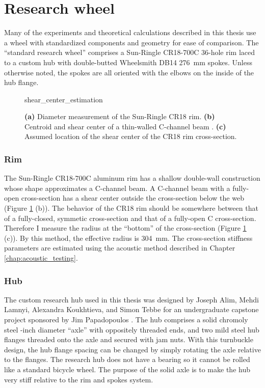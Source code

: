\documentclass[../../thesis.tex]{subfiles}
\begin{document}
\section{Research wheel}
\label{app:std_research_wheel}
Many of the experiments and theoretical calculations described in this thesis use a wheel with standardized components and geometry for ease of comparison. The ``standard research wheel'' comprises a Sun-Ringle CR18-700C 36-hole rim laced to a custom hub with double-butted Wheelsmith DB14 \SI{276}{mm} spokes. Unless otherwise noted, the spokes are all oriented with the elbows on the inside of the hub flange.

\begin{figure}[h]
\centering
{shear_center_estimation}
\caption{\textbf{(a)} Diameter measurement of the Sun-Ringle CR18 rim. \textbf{(b)} Centroid and shear center of a thin-walled C-channel beam \cite{Timoshenko1961}. \textbf{(c)} Assumed location of the shear center of the CR18 rim cross-section.}
\label{fig:shear_center_estimation}
\end{figure}

\subsubsection*{Rim}

The Sun-Ringle CR18-700C aluminum rim has a shallow double-wall construction whose shape approximates a C-channel beam. A C-channel beam with a fully-open cross-section has a shear center outside the cross-section below the web \cite{Timoshenko1961} (Figure \ref{fig:shear_center_estimation} (b)). The behavior of the CR18 rim should be somewhere between that of a fully-closed, symmetic cross-section and that of a fully-open C cross-section. Therefore I measure the radius at the ``bottom'' of the cross-section (Figure \ref{fig:shear_center_estimation} (c)). By this method, the effective radius is \SI{304}{mm}. The cross-section stiffness parameters are estimated using the acoustic method described in Chapter \ref{chap:acoustic_testing}.

\subsubsection*{Hub}
The custom research hub used in this thesis was designed by Joseph Alim, Mehdi Lamnyi, Alexandra Koukhtieva, and Simon Tebbe for an undergraduate capstone project sponsored by Jim Papadopoulos \cite{Alim2016}. The hub comprises a solid chromoly steel -inch diameter ``axle'' with oppositely threaded ends, and two mild steel hub flanges threaded onto the axle and secured with jam nuts. With this turnbuckle design, the hub flange spacing can be changed by simply rotating the axle relative to the flanges. The research hub does not have a bearing so it cannot be rolled like a standard bicycle wheel. The purpose of the solid axle is to make the hub very stiff relative to the rim and spokes system.
\end{document}
